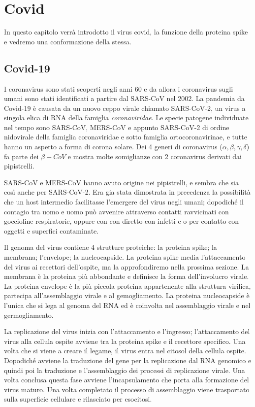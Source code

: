 \chapter{Covid}\label{chapter:Covid}
In questo capitolo verrà introdotto il virus covid, la funzione della proteina spike e vedremo una conformazione della stessa. 


\section{Covid-19}\label{sec:cap_sec_subsec}

I coronavirus sono stati scoperti negli anni 60 e da allora i coronavirus sugli umani sono stati identificati a partire dal SARS-CoV nel 2002. La pandemia da Covid-19 
è causata da un nuovo ceppo virale chiamato SARS-CoV-2, un virus a singola elica di RNA della famiglia \emph{coronaviridae}. Le specie patogene individuate nel tempo
sono SARS-CoV, MERS-CoV e appunto SARS-CoV-2 di ordine nidovirale della famiglia coronaviridae e sotto famiglia ortocoronavirinae, e tutte hanno un aspetto a forma
di corona solare. Dei 4 generi di coronavirus ($\alpha, \beta, \gamma, \delta$) fa parte dei $\beta-CoV$ e mostra molte somiglianze con 2 coronavirus derivati dai 
pipistrelli. 

SARS-CoV e MERS-CoV hanno avuto origine nei pipistrelli, e sembra che sia così anche per SARS-CoV-2. Era gia stata dimostrata in precedenza la possibilità che un host
intermedio facilitasse l'emergere del virus negli umani; dopodiché il contagio tra uomo e uomo può avvenire attraverso contatti ravvicinati con goccioline respiratorie, 
oppure con con diretto con infetti e o per contatto con oggetti e superfici contaminate.

Il genoma del virus contiene 4 strutture proteiche: la proteina spike; la membrana; l'envelope; la nucleocapside. La proteina spike media l'attaccamento del virus ai 
recettori dell'ospite, ma la approfondiremo nella prossima sezione. La membrana è la proteina più abbondante e definisce la forma dell'involucro virale. La proteina 
envelope è la più piccola proteina appartenente alla struttura virilica, partecipa all'assemblaggio virale e al gemogliamento. La proteina nucleocapside è l'unica che 
si lega al genoma del RNA ed è coinvolta nel assemblaggio virale e nel germogliamento. 

La replicazione del virus inizia con l'attaccamento e l'ingresso; l'attaccamento del virus alla cellula ospite avviene tra la proteina spike e il recettore specifico. 
Una volta che si viene a creare il legame, il virus entra nel citosol della cellula ospite. Dopodiché avviene la traduzione del gene per la replicazione dal RNA 
genomico e quindi poi la traduzione e l'assemblaggio dei processi di replicazione virale. Una volta conclusa questa fase avviene l'incapsulamento che porta alla 
formazione del virus maturo. Una volta completato il processo di assemblaggio viene trasportato sulla superficie cellulare e rilasciato per esocitosi.

